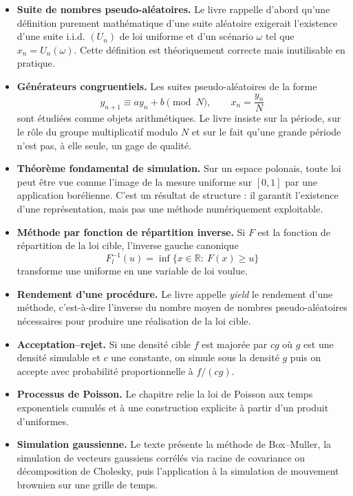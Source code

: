 \documentclass[11pt,a4paper]{article}
\newcommand{\R}{\mathbb{R}}
\begin{document}
\begin{itemize}
  \item \textbf{Suite de nombres pseudo-aléatoires.} Le livre rappelle d'abord qu'une définition purement mathématique d'une suite aléatoire exigerait l'existence d'une suite i.i.d. $(U_n)$ de loi uniforme et d'un scénario $\omega$ tel que $x_n=U_n(\omega)$. Cette définition est théoriquement correcte mais inutilisable en pratique.
  \item \textbf{Générateurs congruentiels.} Les suites pseudo-aléatoires de la forme
  \[
    y_{n+1}\equiv ay_n+b \pmod N,\qquad x_n=\frac{y_n}{N}
  \]
  sont étudiées comme objets arithmétiques. Le livre insiste sur la période, sur le rôle du groupe multiplicatif modulo $N$ et sur le fait qu'une grande période n'est pas, à elle seule, un gage de qualité.
  \item \textbf{Théorème fondamental de simulation.} Sur un espace polonais, toute loi peut être vue comme l'image de la mesure uniforme sur $[0,1]$ par une application borélienne. C'est un résultat de structure : il garantit l'existence d'une représentation, mais pas une méthode numériquement exploitable.
  \item \textbf{Méthode par fonction de répartition inverse.} Si $F$ est la fonction de répartition de la loi cible, l'inverse gauche canonique
  \[
    F_l^{-1}(u)=\inf\{x\in\R:\ F(x)\ge u\}
  \]
  transforme une uniforme en une variable de loi voulue.
  \item \textbf{Rendement d'une procédure.} Le livre appelle \emph{yield} le rendement d'une méthode, c'est-à-dire l'inverse du nombre moyen de nombres pseudo-aléatoires nécessaires pour produire une réalisation de la loi cible.
  \item \textbf{Acceptation--rejet.} Si une densité cible $f$ est majorée par $cg$ où $g$ est une densité simulable et $c$ une constante, on simule sous la densité $g$ puis on accepte avec probabilité proportionnelle à $f/(cg)$.
  \item \textbf{Processus de Poisson.} Le chapitre relie la loi de Poisson aux temps exponentiels cumulés et à une construction explicite à partir d'un produit d'uniformes.
  \item \textbf{Simulation gaussienne.} Le texte présente la méthode de Box--Muller, la simulation de vecteurs gaussiens corrélés via racine de covariance ou décomposition de Cholesky, puis l'application à la simulation de mouvement brownien sur une grille de temps.
\end{itemize}
\end{document}
